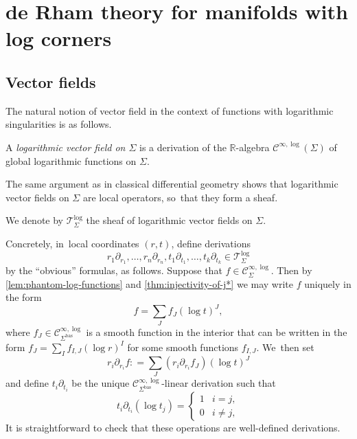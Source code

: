 \documentclass[JEP,XML,SOM,Unicode,NoFloatCountersInSection,published]{cedram}
\theoremstyle{definition}
\theoremstyle{remark}
\let\defn\emph
\newcommand{\RR}{\mathbb{R}}
\newcommand{\defas}{\mathrel{\mathop:}=}
\newcommand{\Cinflog}[1]{\mathscr{C}^{\infty,\log}_{#1}}
\newcommand{\VFlog}[1]{\mathcal{T}^{\log}_{#1}}
\newcommand{\logcvf}[1]{#1\partial_{#1}}
\newcommand{\Sig}{\Sigma}
\newcommand{\bas}[1]{{#1}^{\mathrm{bas}}}
\newcommand{\Sigbas}{\bas{\Sig}}
\begin{document}
\section{de Rham theory for manifolds with log corners}

\subsection{Vector fields}\label{sec:vector-fields}

The natural notion of vector field in the context of functions with logarithmic singularities is as follows.
\begin{definition} A \defn{logarithmic vector field on $\Sig$} is a derivation of the $\RR$-algebra $\Cinflog{}(\Sig)$ of global logarithmic functions on $\Sig$.
\end{definition}

The same argument as in classical differential geometry shows that logarithmic vector fields on $\Sig$ are local operators, so~that they form a sheaf.

\begin{definition}
We denote by $\VFlog{\Sig}$ the sheaf of logarithmic vector fields on $\Sig$.
\end{definition}

Concretely, in~local coordinates $(r,t)$, define derivations\vspace*{-3pt}
\begin{equation}
\logcvf{r_1},\ldots,\logcvf{r_n}, \logcvf{t_1},\ldots,\logcvf{t_k}\in \VFlog{\Sig} \label{eq:coord-vfs}
\end{equation}
by the ``obvious'' formulas, as follows. Suppose that $f \in \Cinflog{\Sig}$. Then by \autoref{lem:phantom-log-functions} and \autoref{thm:injectivity-of-j*} we may write $f$ uniquely in the form\vspace*{-1pt}
\[
f = \sum_J f_J (\log t)^J,
\]
where $f_J \in \Cinflog{\Sigbas}$ is a smooth function in the interior that
can be written in the form $f_J = \sum_I f_{I,J} (\log r)^I$ for some smooth functions $f_{I,J}$. We~then set\vspace*{-3pt}
\[
\logcvf{r_i} f \defas \sum_J (\logcvf{r_i} f_J) (\log t)^J
\]
and define $\logcvf{t_i}$ be the unique $\Cinflog{\Sigbas}$-linear derivation such that\vspace*{-3pt}
\[
\logcvf{t_i} (\log t_j) = \begin{cases}
1 & i=j, \\
0 & i \neq j,
\end{cases}
\]
It is straightforward to check that these operations are well-defined derivations.
\end{document}
